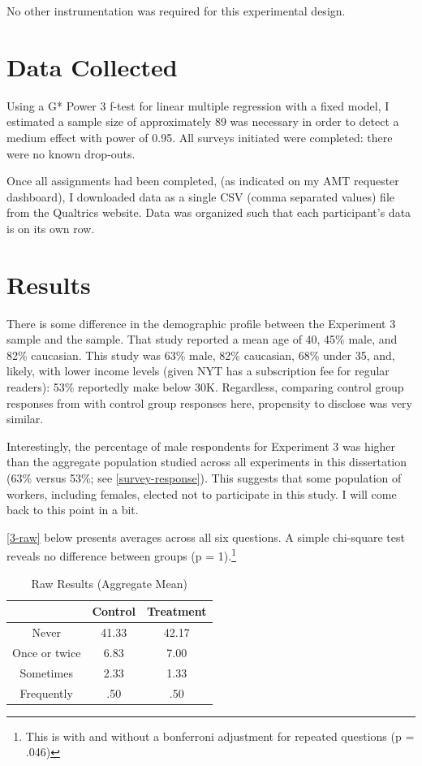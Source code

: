 No other instrumentation was required for this experimental design.

\section{Data Collected}
\label{datacollected}

Using a G* Power 3 f-test for linear multiple regression with a fixed model, I estimated a sample size of approximately 89 was necessary in order to detect a medium effect with power of 0.95. All surveys initiated were completed: there were no known drop-outs.

Once all assignments had been completed, (as indicated on my AMT requester dashboard), I downloaded data as a single CSV (comma separated values) file from the Qualtrics website. Data was organized such that each participant's data is on its own row.

\section{Results}
\label{results}

There is some difference in the demographic profile between the Experiment 3 sample and the  \citet{Acquisti:2012tp}  sample. That study reported a mean age of 40, 45\% male, and 82\% caucasian. This study was 63\% male, 82\% caucasian, 68\% under 35, and, likely, with lower income levels (given NYT has a subscription fee for regular readers): 53\% reportedly make below 30K. Regardless, comparing control group responses from  \cite{Acquisti:2012tp}  with control group responses here, propensity to disclose was very similar.

Interestingly, the percentage of male respondents for Experiment 3 was higher than the aggregate population studied across all experiments in this dissertation  (63\% versus 53\%; see \autoref{survey-response}).  This suggests that some population of workers, including females, elected not to participate in this study. I will come back to this point in a bit.

 \autoref{3-raw}  below presents averages across all six questions. A simple chi-square test reveals no difference between groups  (p = 1).\footnote{This is with and without a bonferroni adjustment for repeated questions (p = .046)} 


\begin{table}
\caption{Raw Results (Aggregate Mean)}
\label{3-raw}
\centering
\begin{tabular}{ccc}
\hline 
 & Control & Treatment\tabularnewline
\hline 
Never & 41.33 & 42.17\tabularnewline
Once or twice & 6.83 & 7.00\tabularnewline
Sometimes & 2.33 & 1.33\tabularnewline
Frequently & .50 & .50\tabularnewline
\end{tabular}\end{table}


